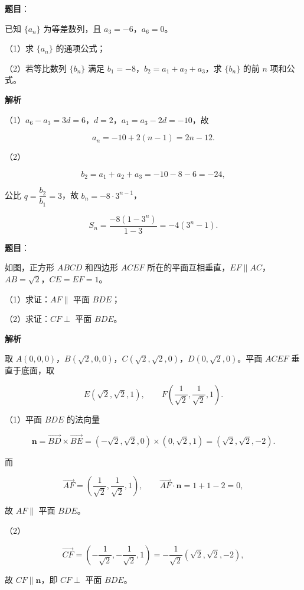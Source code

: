\begin{answer}

\textbf{题目}：

已知 $\{a_n\}$ 为等差数列，且 $a_3=-6$，$a_6=0$。

（1）求 $\{a_n\}$ 的通项公式；

（2）若等比数列 $\{b_n\}$ 满足 $b_1=-8$，$b_2=a_1+a_2+a_3$，求 $\{b_n\}$ 的前 $n$ 项和公式。

\textbf{解析}

（1）$a_6-a_3=3d=6$，$d=2$，$a_1=a_3-2d=-10$，故

\nopagebreak[4]
\[a_n=-10+2(n-1)=2n-12.\]

（2）

\nopagebreak[4]
\[b_2=a_1+a_2+a_3=-10-8-6=-24,\]

公比 $q=\dfrac{b_2}{b_1}=3$，故 $b_n=-8\cdot3^{n-1}$，

\nopagebreak[4]
\[S_n=\frac{-8(1-3^n)}{1-3}=-4(3^n-1).\]


\end{answer}
\begin{answer}

\textbf{题目}：

如图，正方形 $ABCD$ 和四边形 $ACEF$ 所在的平面互相垂直，$EF\parallel AC$，$AB=\sqrt2$，$CE=EF=1$。

（1）求证：$AF\parallel$ 平面 $BDE$；

（2）求证：$CF\perp$ 平面 $BDE$。
\nopagebreak[4]
\begin{center}\end{center}
\nopagebreak[4]
\textbf{解析}

取 $A(0,0,0)$，$B(\sqrt2,0,0)$，$C(\sqrt2,\sqrt2,0)$，$D(0,\sqrt2,0)$。平面 $ACEF$ 垂直于底面，取

\nopagebreak[4]
\[E(\sqrt2,\sqrt2,1),\qquad F\left(\frac1{\sqrt2},\frac1{\sqrt2},1\right).\]

（1）平面 $BDE$ 的法向量

\nopagebreak[4]
\[\boldsymbol n=\overrightarrow{BD}\times\overrightarrow{BE}
=(-\sqrt2,\sqrt2,0)\times(0,\sqrt2,1)
=(\sqrt2,\sqrt2,-2).\]

而

\nopagebreak[4]
\[\overrightarrow{AF}=\left(\frac1{\sqrt2},\frac1{\sqrt2},1\right),\qquad
\overrightarrow{AF}\cdot\boldsymbol n=1+1-2=0,\]

故 $AF\parallel$ 平面 $BDE$。

（2）

\nopagebreak[4]
\[\overrightarrow{CF}=\left(-\frac1{\sqrt2},-\frac1{\sqrt2},1\right)
=-\frac1{\sqrt2}(\sqrt2,\sqrt2,-2),\]

故 $CF\parallel\boldsymbol n$，即 $CF\perp$ 平面 $BDE$。


\end{answer}
